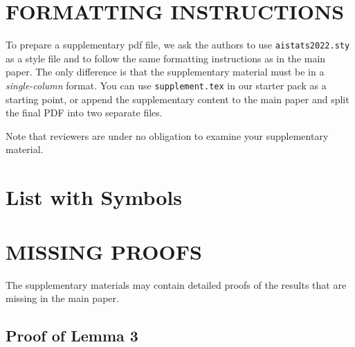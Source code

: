 \documentclass[twoside]{article}
\begin{document}
%

%

\onecolumn
{}

\section{FORMATTING INSTRUCTIONS}

To prepare a supplementary pdf file, we ask the authors to use \texttt{aistats2022.sty} as a style file and to follow the same formatting instructions as in the main paper.
The only difference is that the supplementary material must be in a \emph{single-column} format.
You can use \texttt{supplement.tex} in our starter pack as a starting point, or append the supplementary content to the main paper and split the final PDF into two separate files.

Note that reviewers are under no obligation to examine your supplementary material.

\section{List with Symbols}


\section{MISSING PROOFS}

The supplementary materials may contain detailed proofs of the results that are missing in the main paper.

\subsection{Proof of Lemma 3}
\end{document}
